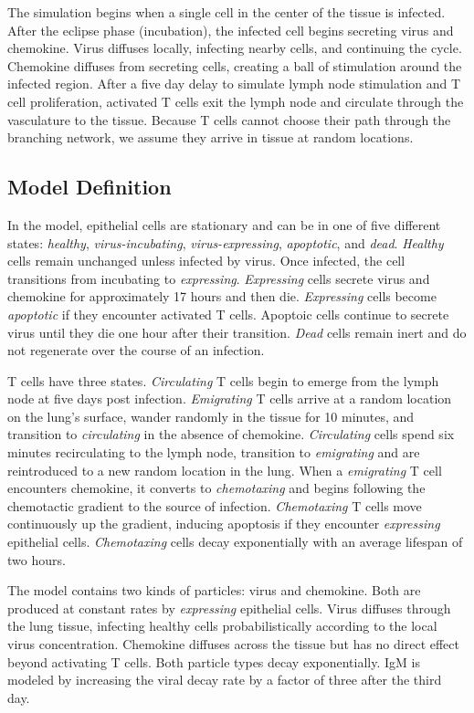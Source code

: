 \documentclass[10pt]{article}
\begin{document}
The simulation begins when a single cell in the center of the tissue is infected. After the eclipse phase (incubation), the infected cell begins secreting virus and chemokine. Virus diffuses locally, infecting nearby cells, and continuing the cycle. Chemokine diffuses from secreting cells, creating a ball of stimulation around the infected region. After a five day delay to simulate lymph node stimulation and T cell proliferation, activated T cells exit the lymph node and circulate through the vasculature to the tissue. Because T  cells cannot choose their path through the branching network, we assume they arrive in tissue at random locations. 


\subsection*{Model Definition}

In the model, epithelial cells are stationary and can be in one of five different states: \emph{healthy}, \emph{virus-incubating}, \emph{virus-expressing}, \emph{apoptotic}, and \emph{dead}. \emph{Healthy} cells remain unchanged unless infected by virus. Once infected, the cell transitions from {incubating} to \emph{expressing}. \emph{Expressing} cells secrete virus and chemokine for approximately 17 hours and then die. \emph{Expressing} cells become \emph{apoptotic} if they encounter activated T cells. Apoptoic cells continue to secrete virus until they die one hour after their transition. \emph{Dead} cells remain inert and do not regenerate over the course of an infection.

T cells have three states. \emph{Circulating} T cells begin to emerge from the lymph node at five days post infection. \textit{Emigrating} T cells arrive at a random location on the lung's surface, wander randomly in the tissue for 10 minutes, and transition to \emph{circulating} in the absence of chemokine. \emph{Circulating} cells spend six minutes recirculating to the lymph node, transition to \emph{emigrating} and are reintroduced to a new random location in the lung. When a \emph{emigrating} T cell encounters chemokine, it converts to \emph{chemotaxing} and begins following the chemotactic gradient to the source of infection. \emph{Chemotaxing} T cells move continuously up the gradient, inducing apoptosis if they encounter \emph{expressing} epithelial cells. \emph{Chemotaxing} cells decay exponentially with an average lifespan of two hours. 

The model contains two kinds of particles: virus and chemokine. Both are produced at constant rates by \emph{expressing} epithelial cells.  Virus diffuses through the lung tissue, infecting healthy cells probabilistically according to the local virus concentration. Chemokine diffuses across the tissue but has no direct effect beyond activating T cells. Both particle types decay exponentially.  IgM is modeled by increasing the viral decay rate by a factor of three after the third day.
\end{document}
